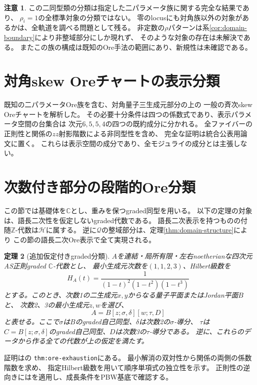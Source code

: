 \documentclass[11pt,a4paper]{ltjsarticle}
\newtheorem{theorem}{定理}[section]
\theoremstyle{definition}
\newtheorem{remark}[theorem]{注意}
\newcommand{\ZZ}{\mathbb Z}
\begin{document}
\begin{remark}
この二同型類の分類は指定した二パラメータ族に関する完全な結果であり、
$\rho_i=1$の全標準対象の分類ではない。
零のlocusにも対角族以外の対象があるかは、全軌道を調べる問題として残る。
非定数の$\rho$パターンは系\ref{cor:domain-boundary}により非整域部分にしか現れず、
そのような対象の存在は未解決である。
またこの族の構成は既知のOre手法の範囲にあり、新規性は未確認である。
\end{remark}

\section{対角skew Oreチャートの表示分類}
既知の二パラメータOre族を含む、対角量子三生成元部分の上の
一般の斉次skew Oreチャートを解析した。
その必要十分条件は四つの係数式であり、表示パラメータ空間の台集合は
次元$6,5,5,4$の四つの既約成分に分かれる。
全ファイバーの正則性と関係の$zz$射影階数による非同型性を含め、
完全な証明は統合公表用論文に置く。
これらは表示空間の成分であり、全モジュライの成分とは主張しない。
\section{次数付き部分の段階的Ore分類}
この節では基礎体を$\mathbb C$とし、重みを保つgraded同型を用いる。
以下の定理の対象は、語長二次性を仮定しないgraded代数である。
語長二次表示を持つものの付随$\ZZ$-代数は$\mathcal H$に属する。
逆に$\mathcal Q$の整域部分は、定理\ref{thm:domain-structure}により
この節の語長二次Ore表示で全て実現される。

\begin{theorem}[追加仮定付きgraded分類]\label{thm:graded-ore-summary}
$A$を連結・局所有限・左右noetherianな四次元AS正則graded $\mathbb C$-代数とし、
最小生成元次数を$(1,1,2,3)$、Hilbert級数を
\[
H_A(t)=\frac{1}{(1-t)^2(1-t^2)(1-t^3)}
\]
とする。このとき、次数1の二生成元$x,y$からなる量子平面またはJordan平面$B$と、
次数2、3の最小生成元$z,w$を選び、
\[
A=B[z;\sigma,\delta][w;\tau,D]
\]
と表せる。ここで$\sigma$は$B$のgraded自己同型、$\delta$は次数2の$\sigma$-導分、
$\tau$は$C=B[z;\sigma,\delta]$のgraded自己同型、$D$は次数3の$\tau$-導分である。
逆に、これらのデータから作る全ての代数が上の仮定を満たす。
\end{theorem}
証明はの
\texttt{thm:ore-exhaustion}にある。
最小解消の双対性から関係の両側の係数階数を求め、
指定Hilbert級数を用いて順序単項式の独立性を示す。
正則性の逆向きには\cite[Theorem~3.3]{LWW}を適用し、成長条件をPBW基底で確認する。
\end{document}
